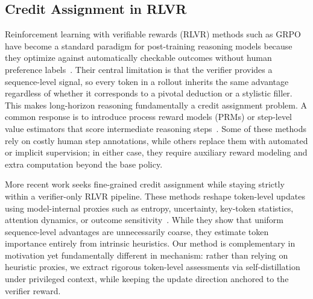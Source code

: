 \subsection{Credit Assignment in RLVR}
Reinforcement learning with verifiable rewards (RLVR) methods such as GRPO~\citep{grpo} have become a standard paradigm for post-training reasoning models because they optimize against automatically checkable outcomes without human preference labels~\citep{grpo,deepseekr1}. Their central limitation is that the verifier provides a sequence-level signal, so every token in a rollout inherits the same advantage regardless of whether it corresponds to a pivotal deduction or a stylistic filler. This makes long-horizon reasoning fundamentally a credit assignment problem. A common response is to introduce process reward models (PRMs) or step-level value estimators that score intermediate reasoning steps~\citep{lightman2024lets,wang2024math,luo2024improve,chen2024step,zhang2024generative,cui2025process}. Some of these methods rely on costly human step annotations, while others replace them with automated or implicit supervision; in either case, they require auxiliary reward modeling and extra computation beyond the base policy.

More recent work seeks fine-grained credit assignment while staying strictly within a verifier-only RLVR pipeline. These methods reshape token-level updates using model-internal proxies such as entropy, uncertainty, key-token statistics, attention dynamics, or outcome sensitivity~\citep{cheng2026reasoning,wangbeyond,chen2025seed,sun2025ktaemodelfreealgorithmkeytokens,xie2025unlocking,li2025attention,chen2025beyond,li2026outcome}. While they show that uniform sequence-level advantages are unnecessarily coarse, they estimate token importance entirely from intrinsic heuristics. Our method is complementary in motivation yet fundamentally different in mechanism: rather than relying on heuristic proxies, we extract rigorous token-level assessments via self-distillation under privileged context, while keeping the update direction anchored to the verifier reward.

